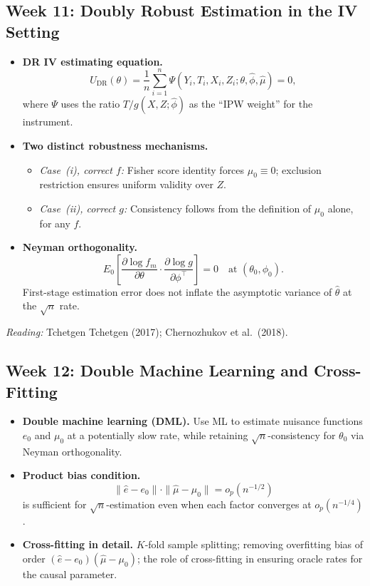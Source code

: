 \documentclass[12pt]{article}
\begin{document}
\subsection{Week 11: Doubly Robust Estimation in the IV Setting}

\begin{itemize}
  \item \textbf{DR IV estimating equation.}
    \[
      U_{\mathrm{DR}}(\theta) = \frac{1}{n}\sum_{i=1}^n
        \Psi(Y_i, T_i, X_i, Z_i;\theta, \hat\phi, \hat\mu) = 0,
    \]
    where $\Psi$ uses the ratio $T/g(X,Z;\hat\phi)$ as the ``IPW
    weight'' for the instrument.

  \item \textbf{Two distinct robustness mechanisms.}
    \begin{itemize}
      \item \emph{Case~(i), correct $f$:} Fisher score identity forces
        $\mu_0 \equiv 0$; exclusion restriction ensures uniform validity
        over $Z$.
      \item \emph{Case~(ii), correct $g$:} Consistency follows from the
        definition of $\mu_0$ alone, for any $f$.
    \end{itemize}

  \item \textbf{Neyman orthogonality.}
    \[
      E_0\!\left[\frac{\partial \log f_m}{\partial\theta} \cdot
                \frac{\partial \log g}{\partial\phi^\top}\right] = 0
      \quad\text{at }(\theta_0,\phi_0).
    \]
    First-stage estimation error does not inflate the asymptotic
    variance of $\hat\theta$ at the $\sqrt{n}$ rate.
\end{itemize}

\noindent\textit{Reading:} Tchetgen Tchetgen (2017);
Chernozhukov et al.\ (2018).

\subsection{Week 12: Double Machine Learning and Cross-Fitting}

\begin{itemize}
  \item \textbf{Double machine learning (DML).}
    Use ML to estimate nuisance functions $e_0$ and $\mu_0$ at a
    potentially slow rate, while retaining $\sqrt{n}$-consistency for
    $\theta_0$ via Neyman orthogonality.

  \item \textbf{Product bias condition.}
    \[
      \|\hat e - e_0\| \cdot \|\hat\mu - \mu_0\| = o_p(n^{-1/2})
    \]
    is sufficient for $\sqrt{n}$-estimation even when each factor
    converges at $o_p(n^{-1/4})$.

  \item \textbf{Cross-fitting in detail.}
    $K$-fold sample splitting; removing overfitting bias of order
    $(\hat e - e_0)(\hat\mu - \mu_0)$; the role of cross-fitting in
    ensuring oracle rates for the causal parameter.
\end{itemize}
\end{document}
